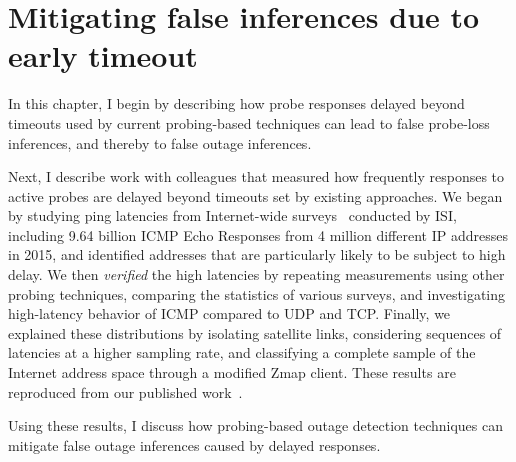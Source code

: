 
\chapter{Mitigating false inferences due to early timeout}
\label{cpt:timeouts}

In this chapter, I begin by describing how probe responses delayed beyond
timeouts used by current probing-based techniques can lead to false
probe-loss inferences, and thereby to false outage inferences. 

Next, I describe work with colleagues that measured how frequently responses
to active probes are delayed beyond timeouts set by existing
approaches. We began by studying ping latencies from Internet-wide surveys~\cite{census-survey} conducted by ISI,
including 9.64 billion ICMP Echo Responses from 4 million different IP
addresses in 2015, and identified addresses that are particularly likely
to be subject to high delay.  We then \emph{verified} the high latencies
by repeating measurements using other probing techniques, comparing the
statistics of various surveys, and investigating high-latency
behavior of ICMP compared to UDP and TCP.  Finally, we
explained these distributions by isolating satellite links,
considering sequences of latencies at a higher sampling rate,
and classifying a complete sample of the Internet address
space through a modified Zmap client. These results are reproduced
from our published work~\cite{timeouts}.

Using these results, I discuss how probing-based outage
detection techniques can mitigate false outage inferences caused by
delayed responses.


